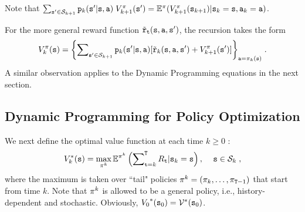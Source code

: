 \begin{remark}
    Note that $\sum\nolimits_{{\tt s}' \in {\mathcal{S}_{k + 1}}} {{{\tt p}_k}({\tt s}'|{\tt s},{\tt a})} \;V_{k + 1}^\pi ({\tt s}') = {\mathbb{E}^\pi }(V_{k + 1}^\pi ({{\tt s}_{k + 1}})|{{\tt s}_k} = {\tt s},{{\tt a}_k} = {\tt a})$.
\end{remark}

\begin{remark}
    For the more general reward function ${\tilde {{\tt r}}_{\tt t}}({\tt s},{\tt a},{\tt s}')$, the recursion takes the form
                     \[V_k^\pi ({\tt s}) = {\left\{ {\sum\nolimits_{{\tt s}' \in {\mathcal{S}_{k + 1}}} {{{\tt p}_k}({\tt s}'|{\tt s},{\tt a})} [{\tilde {{\tt r}}_k}({\tt s},{\tt a},{\tt s}') + V_{k + 1}^\pi ({\tt s}')]} \right\}_{{\tt a} = {\pi _k}({\tt s})}}\;.\]
                      A similar observation applies to the Dynamic Programming
equations in the next section.
\end{remark}


\subsection{Dynamic Programming for Policy Optimization}

We next define the optimal value function at each time $k \ge 0$ :
\[
V_k^{*}({\tt s}) = \mathop {\max }\limits_{{\pi ^k}}
{\mathbb{E}^{{\pi ^k}}}\left( {\sum\nolimits_{{\tt t} = k}^{\tt T}
{{R_{\tt t}}|{{\tt s}_k} = {\tt s}} } \right),\quad \,{\tt s} \in
{\mathcal{S}_k} \;,
\]
where the maximum is taken over ``tail" policies ${\pi ^k} =
({\pi_k}, \ldots ,{\pi _{{\tt T} -1}})$ that start from
time $k$. Note that ${\pi ^k}$ is allowed to be a general
policy, i.e., history-dependent and stochastic. Obviously,
${V_0}^*({{\tt s}_0}) = {\mathcal{V}^*}({{\tt s}_0})$.

